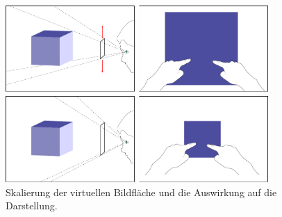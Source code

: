 \begin{figure}
	\begin{center}
		\includegraphics[width=10cm]{img/screen-scale.pdf}
	\end{center}
	\caption{Skalierung der virtuellen Bildfläche und die Auswirkung auf die Darstellung.}
	\label{fig:screen-scale}
\end{figure}


